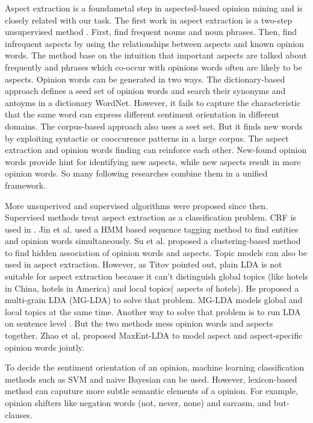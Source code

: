 Aspect extraction is a foundametal step in aspected-based opinion mining and is closely related with our task. The first work in aspect extraction is a two-step unsupervised method \cite{hu2004mining}. First, find frequent nouns and noun phrases. Then, find infrequent aspects by using the relationships between aspects and known opinion words. The method base on the intuition that important aspects are talked about frequently and phrases which co-occur with opinions words often are likely to be aspects. Opinion words can be generated in two ways. The dictionary-based approach defines a seed set of opinion words and search their synonyms and antoyms in a dictionary WordNet. However, it fails to capture the characteristic that the same word can express different sentiment orientation in different domains. The corpus-based approach also uses a seet set. But it finds new words by exploiting syntactic or cooccurence patterns in a large corpus\cite{hatzivassiloglou1997predicting}. The aspect extraction and opinion words finding can reinforce each other. New-found opinion words provide hint for identifying new aspects, while new aspects result in more opinion words. So many following researches combine them in a unified framework. 

More unsuperived and supervised algorithms were proposed since then. Supervised methods treat aspect extraction as a classification problem. CRF is used in \cite{jakob2010extracting}. Jin et al. \cite{jin2009opinionminer} used a HMM based sequence tagging method to find entities and opinion words simultaneously. Su et al. \cite{su2008hidden} proposed a clustering-based method to find hidden association of opinion words and aspects. Topic models can also be used in aspect extraction. However, as Titov\cite{titov2008modeling} pointed out, plain LDA is not suitable for aspect extraction because it can't distinguish global topics (like hotels in China, hotels in America) and local topics( aspects of hotels). He proposed a multi-grain LDA (MG-LDA) to solve that problem. MG-LDA models global and local topics at the same time. Another way to solve that problem is to run LDA on sentence level \cite{brody2010unsupervised}. But the two methods mess opinion words and aspects together. Zhao et al, \cite{zhao2010jointly} proposed MaxEnt-LDA to model aspect and aspect-specific opinion words jointly.

To decide the sentiment orientation of an opinion, machine learning classification methods such as SVM and naive Bayesian can be used. However, lexicon-based method can caputure more subtle semantic elements of a opinion\cite{ding2008holistic}. For example, opinion shifters like negation words (not, never, none) and sarcasm, and but-clauses. 

